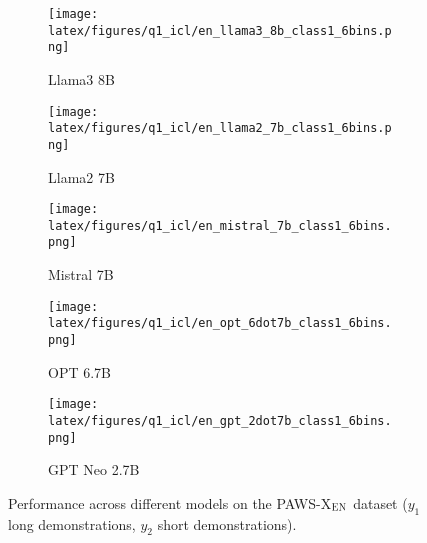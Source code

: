 \begin{figure*}[t!]
    \centering
    \begin{minipage}[t]{\linewidth}
        \begin{subfigure}{0.19\linewidth}
            \centering
            \texttt{[image: latex/figures/q1\_icl/en\_llama3\_8b\_class1\_6bins.png]}
            \caption{Llama3 8B}\label{fig:image1}
        \end{subfigure}%
        \hfill
        \begin{subfigure}{0.19\linewidth}
            \centering
            \texttt{[image: latex/figures/q1\_icl/en\_llama2\_7b\_class1\_6bins.png]}
            \caption{Llama2 7B}\label{fig:image2}
        \end{subfigure}
        \hfill
        \begin{subfigure}{0.19\linewidth}
            \centering
            \texttt{[image: latex/figures/q1\_icl/en\_mistral\_7b\_class1\_6bins.png]}
            \caption{Mistral 7B}\label{fig:image3}
        \end{subfigure}
        \begin{subfigure}{0.19\linewidth}
            \centering
            \texttt{[image: latex/figures/q1\_icl/en\_opt\_6dot7b\_class1\_6bins.png]}
            \caption{OPT 6.7B}\label{fig:image4}
        \end{subfigure}%
        \begin{subfigure}{0.19\linewidth}
        \centering
        \texttt{[image: latex/figures/q1\_icl/en\_gpt\_2dot7b\_class1\_6bins.png]}
        \caption{GPT Neo 2.7B}\label{fig:image4}
        \end{subfigure}%
    \end{minipage}%
    \hfill
    \begin{minipage}[c]{\linewidth}
        \caption{\label{fig:q1-icl-en}Performance across different models on the PAWS-X$_{\textsc{EN}}$ dataset ($y_1$ long demonstrations, $y_2$ short demonstrations).}
    \end{minipage}
\end{figure*}